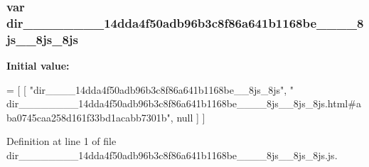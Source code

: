 \subsubsection[{dir\+\_\+\+\_\+\+\_\+\+\_\+\+\_\+\+\_\+\+\_\+\+\_\+14dda4f50adb96b3c8f86a641b1168be\+\_\+\+\_\+\+\_\+\+\_\+8js\+\_\+\+\_\+8js\+\_\+8js}]{\setlength{\rightskip}{0pt plus 5cm}var dir\+\_\+\+\_\+\+\_\+\+\_\+\+\_\+\+\_\+\+\_\+\+\_\+14dda4f50adb96b3c8f86a641b1168be\+\_\+\+\_\+\+\_\+\+\_\+8js\+\_\+\+\_\+8js\+\_\+8js}\label{dir________________14dda4f50adb96b3c8f86a641b1168be________8js____8js__8js_8js_aa12fe47b5bb87c3ca134c83d3f854288}
{\bfseries Initial value\+:}
\begin{DoxyCode}
=
[
    [ \textcolor{stringliteral}{"dir\_\_\_\_14dda4f50adb96b3c8f86a641b1168be\_\_8js\_8js"}, \textcolor{stringliteral}{"
      dir\_\_\_\_\_\_\_\_14dda4f50adb96b3c8f86a641b1168be\_\_\_\_8js\_\_8js\_8js.html#aba0745caa258d161f33bd1acabb7301b"}, null ]
]
\end{DoxyCode}


Definition at line 1 of file dir\+\_\+\+\_\+\+\_\+\+\_\+\+\_\+\+\_\+\+\_\+\+\_\+14dda4f50adb96b3c8f86a641b1168be\+\_\+\+\_\+\+\_\+\+\_\+8js\+\_\+\+\_\+8js\+\_\+8js.\+js.

